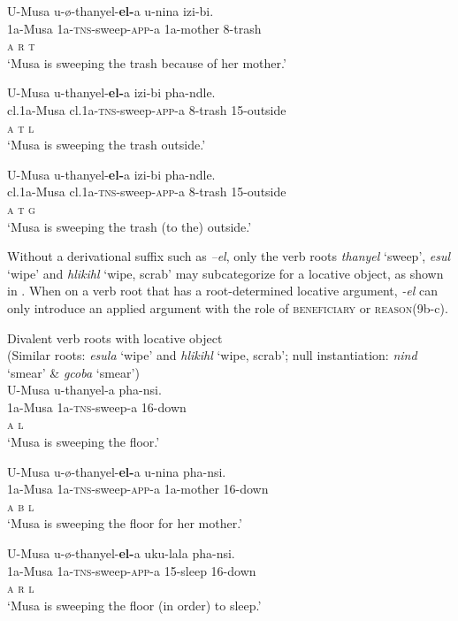 \documentclass[output=paper]{langsci/langscibook}
\begin{document}
\ex
\gll U-Musa u-ø-thanyel-\textbf{el-}a u-nina izi-bi. \\
 1a-Musa 1a-\textsc{tns}-sweep-\textsc{app}-a 1a-mother 8-trash\\
 \textsc{a r t}\\
\glt ‘Musa is sweeping the trash because of her mother.’

\ex
\gll U-Musa u-thanyel-\textbf{el-}a izi-bi pha-ndle. \\
 cl.1a-Musa cl.1a-\textsc{tns}-sweep-\textsc{app}-a 8-trash 15-outside\\
 \textsc{a t l}\\
\glt ‘Musa is sweeping the trash outside.’

\ex
\gll U-Musa u-thanyel-\textbf{el-}a izi-bi pha-ndle. \\
 cl.1a-Musa cl.1a-\textsc{tns}-sweep-\textsc{app}-a 8-trash 15-outside\\
 \textsc{a t g}\\
\glt ‘Musa is sweeping the trash (to the) outside.’
\z
\z

Without a derivational suffix such as \textit{–el}, only the verb roots \textit{thanyel} ‘sweep’, \textit{esul} ‘wipe’ and \textit{hlikihl} ‘wipe, scrab’ may subcategorize for a locative object, as shown in . When on a verb root that has a root-determined locative argument, \textit{-el} can only introduce an applied argument with the role of \textsc{beneficiary} or \textsc{reason}\textit {}(9b-c). 

\ea
{Divalent verb roots with locative object }\\
 (Similar roots: \textit{esula} ‘wipe’ and \textit{hlikihl} ‘wipe, scrab’; null instantiation: \textit{nind} ‘smear’ \& \textit{gcoba} ‘smear’)\\
\ea
\gll U-Musa u-thanyel-a pha-nsi. \\
 1a-Musa 1a-\textsc{tns}-sweep-a 16-down\\
 \textsc{a l}\\
\glt ‘Musa is sweeping the floor.’

\ex
\gll U-Musa u-ø-thanyel-\textbf{el-}a u-nina pha-nsi.\\
 1a-Musa 1a-\textsc{tns}-sweep-\textsc{app}-a 1a-mother 16-down\\
 \textsc{a b l}\\
\glt ‘Musa is sweeping the floor for her mother.’

\ex
\gll U-Musa u-ø-thanyel-\textbf{el-}a uku-lala pha-nsi.\\
 1a-Musa 1a-\textsc{tns}-sweep-\textsc{app}-a 15-sleep 16-down\\
 \textsc{a r l}\\
\glt ‘Musa is sweeping the floor (in order) to sleep.’
\z
\z
\end{document}
